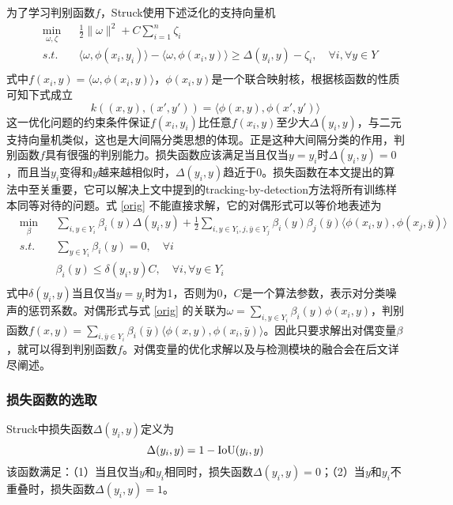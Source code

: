 为了学习判别函数$f$，Struck使用下述泛化的支持向量机
\begin{equation}
\begin{aligned}
& \min_{\omega,\zeta} &&\frac{1}{2}\|\omega\|^2 + C\sum_{i=1}^{n}\zeta_i\\
& s.t.&&\langle \omega,\phi(x_i,y_i)\rangle-\langle\omega,\phi(x_i,y)\rangle \geq \Delta(y_i,y)-\zeta_i,\quad \forall i,\forall y\in Y\\
\end{aligned}
\label{orig}
\end{equation}
式中$f(x_i,y)=\langle\omega,\phi(x_i,y)\rangle$，$\phi(x_i,y)$是一个联合映射核，根据核函数的性质可知下式成立
\begin{equation}
k((x,y),(x',y'))=\langle\phi(x,y),\phi(x',y')\rangle
\end{equation}
这一优化问题的约束条件保证$f(x_i,y_i)$比任意$f(x_i,y)$至少大$\Delta(y_i,y)$，与二元支持向量机类似，这也是大间隔分类思想的体现。正是这种大间隔分类的作用，判别函数$f$具有很强的判别能力。损失函数应该满足当且仅当$y=y_i$时$\Delta(y_i,y)=0$，而且当$y_i$变得和$y$越来越相似时，$\Delta(y_i,y)$趋近于0。损失函数在本文提出的算法中至关重要，它可以解决上文中提到的tracking-by-detection方法将所有训练样本同等对待的问题。式 \ref{orig} 不能直接求解，它的对偶形式可以等价地表述为
\begin{equation}
\begin{aligned}
& \min_{\beta} &&\sum_{i,y\in Y_i}\beta_i(y)\Delta(y_i,y) +\frac{1}{2}\sum_{i,y\in Y_i,j,\bar{y}\in Y_j}\beta_i(y) \beta_j(\bar{y}) \langle\phi(x_i,y),\phi(x_j,\bar{y})\rangle\\
& s.t.&&\sum_{y \in Y_i}\beta_i(y)=0, \quad \forall i\\
& &&\beta_i(y)\le\delta(y_i,y)C, \quad \forall i, \forall y \in Y_i\\
\end{aligned}
\label{dual}
\end{equation}
式中$\delta(y_i,y)$当且仅当$y=y_i$时为1，否则为0，$C$是一个算法参数，表示对分类噪声的惩罚系数。对偶形式与式 \ref{orig} 的关联为$\omega=\sum_{i,y\in Y_i}\beta_i(y)\phi(x_i,y)$，判别函数$f(x,y)=\sum_{i,\bar{y}\in Y_i}\beta_i(\bar{y})\langle\phi(x,y),\phi(x_i,\bar{y})\rangle$。因此只要求解出对偶变量$\beta$，就可以得到判别函数$f$。对偶变量的优化求解以及与检测模块的融合会在后文详尽阐述。
\subsubsection{损失函数的选取}
Struck中损失函数$\Delta(y_i,y)$定义为
\begin{equation}
\Delta(y_i,y)=1-{\rm{IoU}}(y_i,y)
\end{equation}
该函数满足：（1）当且仅当$y$和$y_i$相同时，损失函数$\Delta(y_i,y)=0$；（2）当$y$和$y_i$不重叠时，损失函数$\Delta(y_i,y)=1$。

